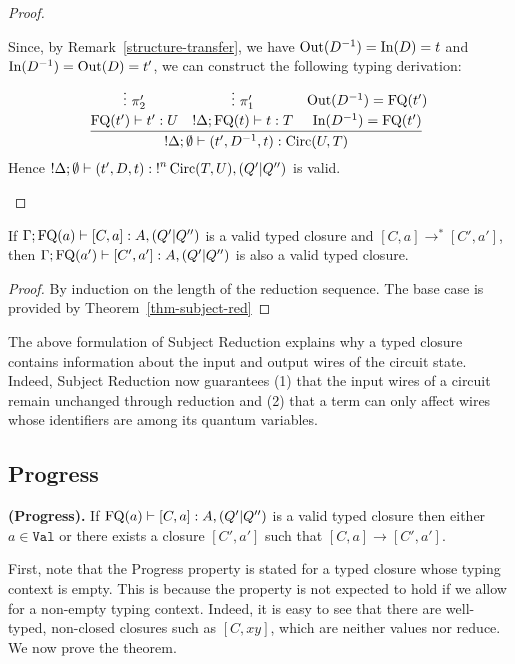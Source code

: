\documentclass[twoside]{article}
\begin{document}
\begin{proof}
\begin{description}
\begin{itemize}
  Since, by 
  Remark~\hyperref[structure-transfer]{\ref*{structure-transfer}}, 
  we have $\mathop{\textrm{Out}}\nolimits(D^{-1})=\mathop{\textrm{In}}\nolimits(D)=t$ and $\mathop{\textrm{In}}\nolimits(D^{-1})=\mathop{\textrm{Out}}\nolimits(D)=t'$, we can construct 
  the following typing derivation:
  \[
  \infer[]{{!}\Delta ;\emptyset\entails (t',D^{-1},t):\Circ(U,T)}{
    \deduce[]{\FQ(t')\entails t':U}{
      \vdots ~\pi_2'
    }
    &
    \deduce[]{{!}\Delta;\FQ(t)\entails t:T}{
      \vdots ~\pi_1'     
    }
    &
    \deduce[]{\In(D^{-1})=\FQ(t')}{
      \Out(D^{-1})=\FQ(t')
    }
  }  
  \]
  Hence ${!}\Delta;\emptyset\vdash (t',D,t):{!}^n\mathop{\textrm{Circ}}\nolimits(T,U),(Q'|Q'')$ 
  is valid.    
\end{itemize}
\end{description}
\end{proof}

\begin{corollary}
If $\Gamma;\mathop{\textrm{FQ}}\nolimits(a)\vdash [C,a]:A,(Q'|Q'')$ is a valid typed closure 
and $[C,a]\to^* [C',a']$, then $\Gamma;\mathop{\textrm{FQ}}\nolimits(a')\vdash [C',a']:A,(Q'|Q'')$ 
is also a valid typed closure.
\end{corollary}

\begin{proof}
By induction on the length of the reduction sequence. The base case is 
provided by Theorem~\hyperref[thm-subject-red]{\ref*{thm-subject-red}}
\end{proof}

The above formulation of Subject Reduction explains why a typed closure contains 
information about the input and output wires of the circuit state. Indeed, 
Subject Reduction now guarantees (1) that the input wires of a circuit 
remain unchanged through reduction and (2) that a term can only affect 
wires whose identifiers are among its quantum variables.

\subsection{Progress}

\begin{theorem}
{\bf (Progress).}
If $\mathop{\textrm{FQ}}\nolimits(a)\vdash [C,a]:A,(Q'|Q'')$ is a valid typed closure then either 
$a\in\mathtt{Val}$ or there exists a closure $[C',a']$ such that 
$[C,a]\to [C',a']$.
\end{theorem}

First, note that the Progress property is stated for a typed closure
whose typing context is empty. This is because the property is not
expected to hold if we allow for a non-empty typing context. Indeed,
it is easy to see that there are well-typed, non-closed closures such
as $[C,xy]$, which are neither values nor reduce. 
We now prove the theorem.
\end{document}
